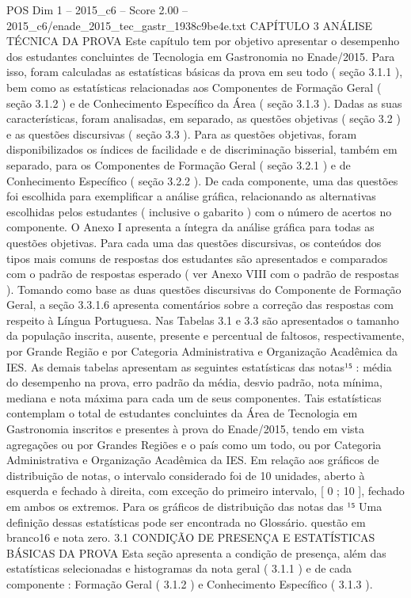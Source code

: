 \begin{textsample}{POS Dim 1 – 2015\_c6 – Score 2.00 – 2015\_c6/enade\_2015\_tec\_gastr\_1938c9be4e.txt}  \label{ex:f1_pos_152}
CAPÍTULO 3 ANÁLISE TÉCNICA DA PROVA Este capítulo tem por objetivo apresentar o desempenho dos estudantes concluintes de Tecnologia em Gastronomia no Enade/2015.
Para isso, foram calculadas as estatísticas básicas da prova em seu todo ( seção 3.1.1 ), bem como as estatísticas relacionadas aos Componentes de Formação Geral ( seção 3.1.2 ) e de Conhecimento Específico da Área ( seção 3.1.3 ).
Dadas as suas características, foram analisadas, em separado, as questões objetivas ( seção 3.2 ) e as questões discursivas ( seção 3.3 ).
Para as questões objetivas, foram disponibilizados os índices de facilidade e de discriminação bisserial, também em separado, para os Componentes de Formação Geral ( seção 3.2.1 ) e de Conhecimento Específico ( seção 3.2.2 ).
De cada componente, uma das questões foi escolhida para exemplificar a análise gráfica, relacionando as alternativas escolhidas pelos estudantes ( inclusive o gabarito ) com o número de acertos no componente.
O Anexo I apresenta a íntegra da análise gráfica para todas as questões objetivas.
Para cada uma das questões discursivas, os conteúdos dos tipos mais comuns de respostas dos estudantes são apresentados e comparados com o padrão de respostas esperado ( ver Anexo VIII com o padrão de respostas ).
Tomando como base as duas questões discursivas do Componente de Formação Geral, a seção 3.3.1.6 apresenta comentários sobre a correção das respostas com respeito à Língua Portuguesa.
Nas Tabelas 3.1 e 3.3 são apresentados o tamanho da população inscrita, ausente, presente e percentual de faltosos, respectivamente, por Grande Região e por Categoria Administrativa e Organização Acadêmica da IES.
As demais tabelas apresentam as seguintes estatísticas das notas¹⁵ : média do desempenho na prova, erro padrão da média, desvio padrão, nota mínima, mediana e nota máxima para cada um de seus componentes.
Tais estatísticas contemplam o total de estudantes concluintes da Área de Tecnologia em Gastronomia inscritos e presentes à prova do Enade/2015, tendo em vista agregações ou por Grandes Regiões e o país como um todo, ou por Categoria Administrativa e Organização Acadêmica da IES.
Em relação aos gráficos de distribuição de notas, o intervalo considerado foi de 10 unidades, aberto à esquerda e fechado à direita, com exceção do primeiro intervalo, [ 0 ; 10 ], fechado em ambos os extremos.
Para os gráficos de distribuição das notas das ¹⁵ Uma definição dessas estatísticas pode ser encontrada no Glossário. questão em branco16 e nota zero. 3.1 CONDIÇÃO DE PRESENÇA E ESTATÍSTICAS BÁSICAS DA PROVA Esta seção apresenta a condição de presença, além das estatísticas selecionadas e histogramas da nota geral ( 3.1.1 ) e de cada componente : Formação Geral ( 3.1.2 ) e Conhecimento Específico ( 3.1.3 ).

\end{textsample}

